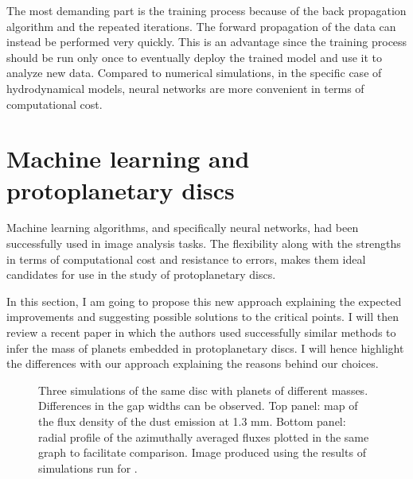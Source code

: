 \documentclass[a4paper,10pt]{report}
\begin{document}
The most demanding part is the training process because of the back propagation 
algorithm and the repeated iterations.
The forward propagation of the data can instead be performed  very quickly.
This is an advantage since the training process should be run only once to eventually deploy the trained model
and use it to analyze new data. Compared to numerical simulations, in the specific case of hydrodynamical models, 
neural networks are more convenient in terms of computational cost.

\section{Machine learning and protoplanetary discs}

Machine learning algorithms, and specifically neural networks, had been successfully used in image analysis tasks.
The flexibility along with the strengths in terms of computational cost and resistance to 
errors, makes them ideal candidates for use in the study of protoplanetary discs.

In this section, I am going to propose this new approach explaining the expected improvements and 
suggesting possible solutions to the critical points. I will then review a recent paper in which the 
authors used successfully similar methods to infer the mass of planets embedded in protoplanetary discs.
I will hence highlight the differences with our approach explaining the reasons behind our choices.

\begin{figure}
    \begin{center}
        \scalebox{0.5}{}
        \scalebox{0.6}{}
    \end{center}
    \caption{Three simulations of the same disc with planets of different masses.
    Differences in the gap widths can be observed.
    Top panel: map of the flux density of the dust emission at 1.3 mm. Bottom panel:
    radial profile of the azimuthally averaged fluxes plotted in the same graph to facilitate comparison.
    Image produced using the results of simulations run for \citet{dstauv}.}
\end{figure}
\end{document}
